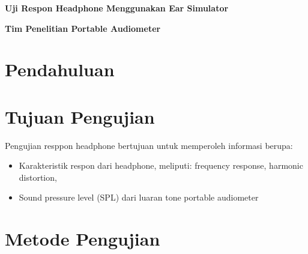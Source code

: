 \documentclass{article}
\begin{document}
	\begin{titlepage}
		\centering
		
		{
			\LARGE
			\bf
			Uji Respon Headphone Menggunakan Ear Simulator
		}
		
		\bigskip
		
		{
			\large
			\bf
			Tim Penelitian Portable Audiometer  
		}
		
		\vfill
	\end{titlepage}
	
	\newpage
	\section{Pendahuluan}
	
	
	\section{Tujuan Pengujian}
	Pengujian resppon headphone bertujuan untuk memperoleh informasi berupa:
	\begin{itemize}
		\item Karakteristik respon dari headphone, meliputi: frequency response, harmonic distortion, 
		\item Sound pressure level (SPL) dari luaran tone portable audiometer
	\end{itemize}
	
	\section{Metode Pengujian}
\end{document}
